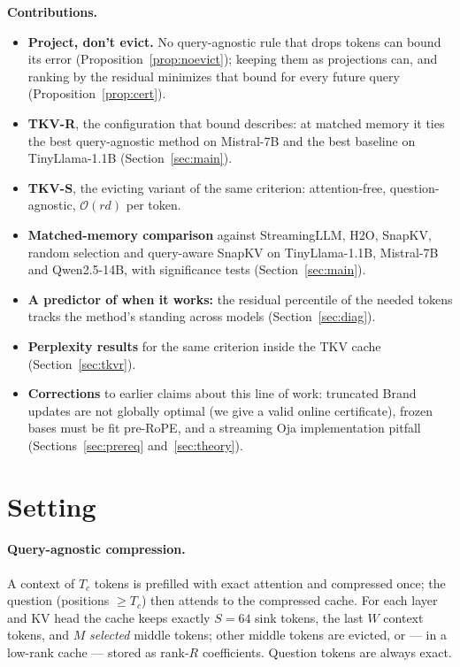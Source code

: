 \documentclass{article}
\begin{document}
\textbf{Contributions.}
\begin{itemize}[leftmargin=*,itemsep=1pt]
  \item \textbf{Project, don't evict.} No query-agnostic rule that drops tokens
        can bound its error (Proposition~\ref{prop:noevict}); keeping them as
        projections can, and ranking by the residual minimizes that bound for
        every future query (Proposition~\ref{prop:cert}).
  \item \textbf{TKV-R}, the configuration that bound describes: at matched
        memory it ties the best query-agnostic method on Mistral-7B and the
        best baseline on TinyLlama-1.1B (Section~\ref{sec:main}).
  \item \textbf{TKV-S}, the evicting variant of the same criterion:
        attention-free, question-agnostic, $\mathcal{O}(rd)$ per token.
  \item \textbf{Matched-memory comparison} against StreamingLLM, H2O, SnapKV,
        random selection and query-aware SnapKV on TinyLlama-1.1B, Mistral-7B
        and Qwen2.5-14B, with significance tests (Section~\ref{sec:main}).
  \item \textbf{A predictor of when it works:} the residual percentile of the
        needed tokens tracks the method's standing across models
        (Section~\ref{sec:diag}).
  \item \textbf{Perplexity results} for the same criterion inside the TKV cache
        (Section~\ref{sec:tkvr}).
  \item \textbf{Corrections} to earlier claims about this line of work:
        truncated Brand updates are not globally optimal (we give a valid
        online certificate), frozen bases must be fit pre-RoPE, and a
        streaming Oja implementation pitfall (Sections~\ref{sec:prereq}
        and~\ref{sec:theory}).
\end{itemize}

\section{Setting}
\label{sec:setup}

\paragraph{Query-agnostic compression.}
A context of $T_c$ tokens is prefilled with exact attention and compressed
once; the question (positions $\ge T_c$) then attends to the compressed cache.
For each layer and KV head the cache keeps exactly $S{=}64$ sink tokens, the
last $W$ context tokens, and $M$ \emph{selected} middle tokens; other middle
tokens are evicted, or --- in a low-rank cache --- stored as rank-$R$
coefficients. Question tokens are always exact.
\end{document}
